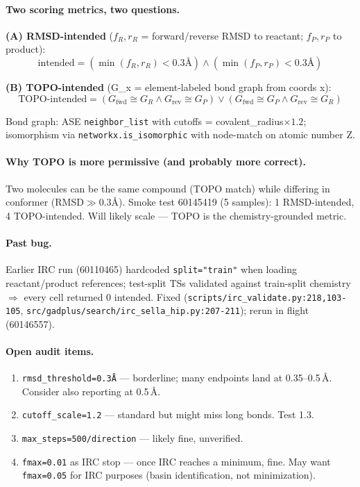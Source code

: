 \documentclass[11pt]{article}
\begin{document}
\paragraph{Two scoring metrics, two questions.}

\textbf{(A) RMSD-intended} ($f_R, r_R$ = forward/reverse RMSD to reactant; $f_P, r_P$ to product):
\[
\text{intended} = (\min(f_R, r_R) < 0.3\text{\AA}) \wedge (\min(f_P, r_P) < 0.3\text{\AA})
\]

\textbf{(B) TOPO-intended} (G\_x = element-labeled bond graph from coords x):
\[
\text{TOPO-intended} = (G_{\text{fwd}} \cong G_R \wedge G_{\text{rev}} \cong G_P) \vee (G_{\text{fwd}} \cong G_P \wedge G_{\text{rev}} \cong G_R)
\]

Bond graph: ASE \texttt{neighbor\_list} with cutoffs = covalent\_radius$\times1.2$;
isomorphism via \texttt{networkx.is\_isomorphic} with node-match on
atomic number Z.

\paragraph{Why TOPO is more permissive (and probably more correct).}
Two molecules can be the same compound (TOPO match) while differing
in conformer (RMSD$\gg$0.3\AA). Smoke test 60145419 (5 samples): 1
RMSD-intended, 4 TOPO-intended. Will likely scale — TOPO is the
chemistry-grounded metric.

\paragraph{Past bug.} Earlier IRC run (60110465) hardcoded
\texttt{split="train"} when loading reactant/product references; test-split
TSs validated against train-split chemistry $\Rightarrow$ every cell
returned 0 intended. Fixed (\texttt{scripts/irc\_validate.py:218,103-105},
\texttt{src/gadplus/search/irc\_sella\_hip.py:207-211}); rerun in flight (60146557).

\paragraph{Open audit items.}
\begin{enumerate}[leftmargin=1.5em]
\item \texttt{rmsd\_threshold=0.3\AA{}} — borderline; many endpoints land
  at 0.35--0.5\,\AA. Consider also reporting at 0.5\,\AA.
\item \texttt{cutoff\_scale=1.2} — standard but might miss long bonds.
  Test 1.3.
\item \texttt{max\_steps=500/direction} — likely fine, unverified.
\item \texttt{fmax=0.01} as IRC stop — once IRC reaches a minimum, fine.
  May want \texttt{fmax=0.05} for IRC purposes (basin identification, not minimization).
\end{enumerate}
\end{document}
